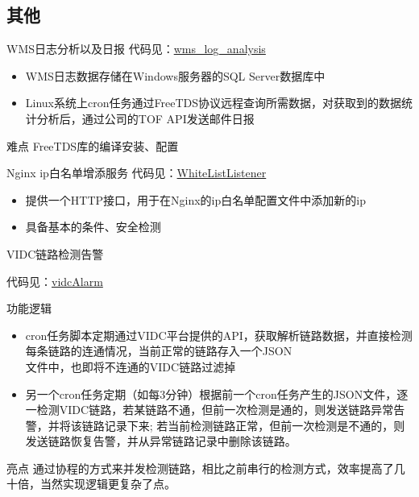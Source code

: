 \documentclass[CJK]{beamer}
\begin{document}
\begin{CJK*}{UTF8}{gbsn}
\section{其他}
\begin{frame}{WMS日志分析以及日报}
代码见：\href{http://10.24.178.60:8000/yongfengxia/wms_log_analysis}{wms\_log\_analysis}
\begin{itemize}
\item WMS日志数据存储在Windows服务器的SQL Server数据库中
\item Linux系统上cron任务通过FreeTDS协议远程查询所需数据，对获取到的数据统计分析后，通过公司的TOF API发送邮件日报
\end{itemize}
\begin{block}{难点}
FreeTDS库的编译安装、配置
\end{block}
\end{frame}

\begin{frame}{Nginx ip白名单增添服务}
代码见：\href{http://10.24.178.60:8000/yongfengxia/whitelistlistener}{WhiteListListener}
\begin{itemize}
\item 提供一个HTTP接口，用于在Nginx的ip白名单配置文件中添加新的ip
\item 具备基本的条件、安全检测
\end{itemize}
\end{frame}

\begin{frame}{VIDC链路检测告警}

代码见：\href{http://10.24.178.60:8000/yongfengxia/scripts/tree/master/vidcAlarm}{vidcAlarm}

\begin{block}{功能逻辑}
\begin{itemize}
\item cron任务脚本定期通过VIDC平台提供的API，获取解析链路数据，并直接检测每条链路的连通情况，当前正常的链路存入一个JSON\\文件中，也即将不连通的VIDC链路过滤掉
\item 另一个cron任务定期（如每3分钟）根据前一个cron任务产生的JSON文件，逐一检测VIDC链路，若某链路不通，但前一次检测是通的，则发送链路异常告警，并将该链路记录下来; 若当前检测链路正常，但前一次检测是不通的，则发送链路恢复告警，并从异常链路记录中删除该链路。
\end{itemize}
\end{block}
\begin{block}{亮点}
通过协程的方式来并发检测链路，相比之前串行的检测方式，效率提高了几十倍，当然实现逻辑更复杂了点。
\end{block}
\end{frame}
\end{CJK*}
\end{document}
